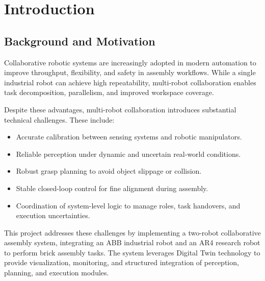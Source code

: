 \chapter{Introduction}
\thispagestyle{fancy}
\vspace*{0cm} %

\section{Background and Motivation}
Collaborative robotic systems are increasingly adopted in modern automation to improve throughput, flexibility, and safety in assembly workflows. While a single industrial robot can achieve high repeatability, multi-robot collaboration enables task decomposition, parallelism, and improved workspace coverage.

Despite these advantages, multi-robot collaboration introduces substantial technical challenges. These include:
\begin{itemize}
    \item Accurate calibration between sensing systems and robotic manipulators.
    \item Reliable perception under dynamic and uncertain real-world conditions.
    \item Robust grasp planning to avoid object slippage or collision.
    \item Stable closed-loop control for fine alignment during assembly.
    \item Coordination of system-level logic to manage roles, task handovers, and execution uncertainties.
\end{itemize}

This project addresses these challenges by implementing a two-robot collaborative assembly system, integrating an ABB industrial robot and an AR4 research robot to perform brick assembly tasks. The system leverages Digital Twin technology to provide visualization, monitoring, and structured integration of perception, planning, and execution modules.

